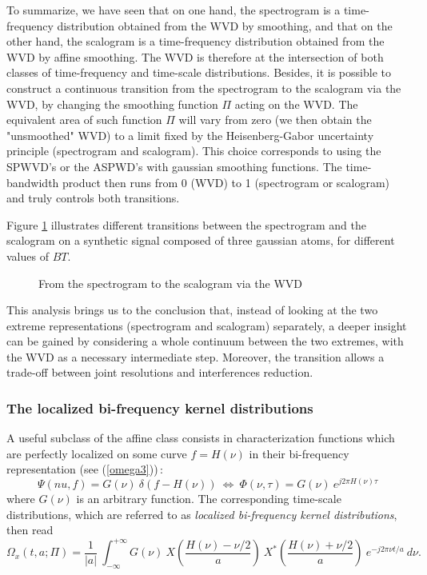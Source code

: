   To summarize, we have seen that on one hand, the spectrogram is a
time-frequency distribution obtained from the WVD by smoothing, and that on
the other hand, the scalogram is a time-frequency distribution obtained
from the WVD by affine smoothing. The WVD is therefore at the intersection
of both classes of time-frequency and time-scale distributions. Besides, it
is possible to construct a continuous transition from the spectrogram to
the scalogram via the WVD, by changing the smoothing function $\Pi$ acting on
the WVD. The equivalent area of such function $\Pi$ will vary from zero (we
then obtain the "unsmoothed" WVD) to a limit fixed by the Heisenberg-Gabor
uncertainty principle (spectrogram and scalogram). This choice corresponds
to using the SPWVD's or the ASPWD's with gaussian smoothing functions.
The time-bandwidth product then runs from 0 (WVD) to 1 (spectrogram or
scalogram) and truly controls both transitions.

  Figure \ref{En2fig3} illustrates different transitions between the
spectrogram and the scalogram on a synthetic signal composed of three
gaussian atoms, for different values of $BT$.
\begin{figure}[htb]
\epsfxsize=14cm
\epsfysize=12cm
\centerline{}
\caption{\label{En2fig3}From the spectrogram to the scalogram via the WVD}
\end{figure}

  This analysis brings us to the conclusion that, instead of looking at the
two extreme representations (spectrogram and scalogram) separately, a
deeper insight can be gained by considering a whole continuum between the
two extremes, with the WVD as a necessary intermediate step. Moreover, the
transition allows a trade-off between joint resolutions and interferences
reduction.

\subsubsection{The localized bi-frequency kernel distributions}
\label{LBFKD}
  A useful subclass of the affine class consists in characterization
functions which are perfectly localized on some curve $f=H(\nu)$ in their
bi-frequency representation (see (\ref{omega3}))\,:
\[\Psi(nu,f)=G(\nu)\ \delta(f-H(\nu))\ \Leftrightarrow\
\Phi(\nu,\tau)=G(\nu)\ e^{j2\pi H(\nu) \tau}\] where $G(\nu)$ is an
arbitrary function. The corresponding time-scale distributions, which are
referred to as {\it localized bi-frequency kernel distributions}, then read
\[\Omega_x(t,a;\Pi)=\frac{1}{|a|}\ \int_{-\infty}^{+\infty} G(\nu)\
X\left(\frac{H(\nu)-\nu/2}{a}\right)\
X^*\left(\frac{H(\nu)+\nu/2}{a}\right)\ e^{-j2\pi\nu t/a}\ d\nu.\]  

